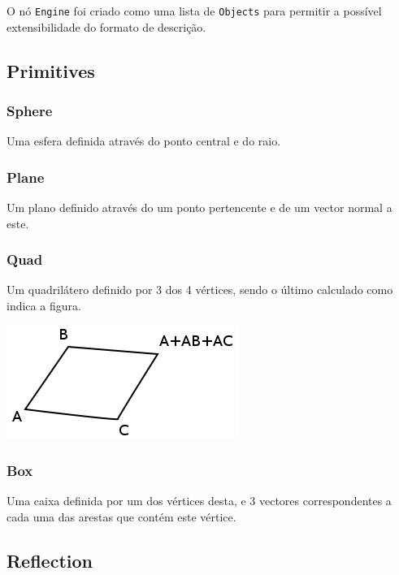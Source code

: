 \documentclass[a4paper]{article}
\begin{document}
O nó \texttt{Engine} foi criado como uma lista de \texttt{Objects} para permitir a possível extensibilidade do formato de descrição.

\cleardoublepage
\subsection{Primitives}
\label{sec:primitives}
\indent \indent 

\subsubsection{Sphere}
\indent \indent Uma esfera definida através do ponto central e do raio.   

\subsubsection{Plane}
\indent \indent Um plano definido através do um ponto pertencente e de um vector normal a este.

\subsubsection{Quad}
\indent \indent Um quadrilátero definido por 3 dos 4 vértices, sendo o último calculado como indica a figura.
\begin{center}
	\includegraphics[scale=0.50]{images/quad.png}
	\label{fig:quad}
\end{center}

\subsubsection{Box}
\indent \indent Uma caixa definida por um dos vértices desta, e 3 vectores correspondentes a cada uma das 
arestas que contém este vértice.

\cleardoublepage
\subsection{Reflection}
\end{document}
